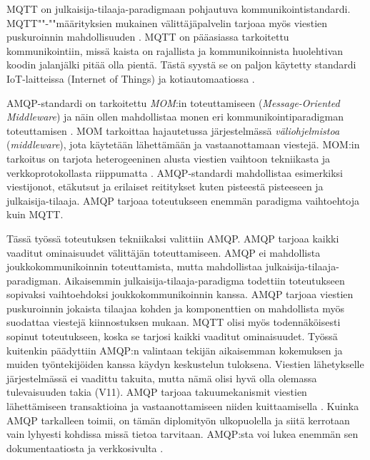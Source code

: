 MQTT on julkaisija-tilaaja-paradigmaan pohjautuva kommunikointistandardi. MQTT""-""mää\-ri\-tyk\-si\-en mukainen välittäjäpalvelin tarjoaa myös viestien puskuroinnin mahdollisuuden \cite{mqtt-specification}. MQTT on pääasiassa tarkoitettu kommunikointiin, missä kaista on rajallista ja kommunikoinnista huolehtivan koodin jalanjälki pitää olla pientä. Tästä syystä se on paljon käytetty standardi IoT-laitteissa (Internet of Things) ja kotiautomaatiossa \cite[s.~9--11]{mqtt-for-iot}.

AMQP-standardi on tarkoitettu \emph{MOM}:in toteuttamiseen (\emph{Message-Oriented Middleware}) ja näin ollen mahdollistaa monen eri kommunikointiparadigman toteuttamisen \cite[s.~6]{AMQP-specification}. MOM tarkoittaa hajautetussa järjestelmässä \emph{väliohjelmistoa} (\emph{middleware}), jota käytetään lähettämään ja vastaanottamaan viestejä. MOM:in tarkoitus on tarjota heterogeeninen alusta viestien vaihtoon tekniikasta ja verkkoprotokollasta riippumatta \cite{mom}. AMQP-standardi mahdollistaa esimerkiksi viestijonot, etäkutsut ja erilaiset reititykset kuten pisteestä pisteeseen ja julkaisija-tilaaja. AMQP tarjoaa toteutukseen enemmän paradigma vaihtoehtoja kuin MQTT.

Tässä työssä toteutuksen tekniikaksi valittiin AMQP. AMQP tarjoaa kaikki vaaditut ominaisuudet välittäjän toteuttamiseen. AMQP ei mahdollista joukkokommunikoinnin toteuttamista, mutta mahdollistaa julkaisija-tilaaja-paradigman. Aikaisemmin julkaisija-ti\-laa\-ja-paradigma todettiin toteutukseen sopivaksi vaihtoehdoksi joukkokommunikoinnin kanssa. AMQP tarjoaa viestien puskuroinnin jokaista tilaajaa kohden ja komponenttien on mahdollista myös suodattaa viestejä kiinnostuksen mukaan. MQTT olisi myös todennäköisesti sopinut toteutukseen, koska se tarjosi kaikki vaaditut ominaisuudet. Työssä kuitenkin päädyttiin AMQP:n valintaan tekijän aikaisemman kokemuksen ja muiden työntekijöiden kanssa käydyn keskustelun tuloksena. Viestien lähetykselle järjestelmässä ei vaadittu takuita, mutta nämä olisi hyvä olla olemassa tulevaisuuden takia (V11). AMQP tarjoaa takuumekanismit viestien lähettämiseen transaktioina ja vastaanottamiseen niiden kuittaamisella \cite[s.~14,21]{AMQP-specification}. Kuinka AMQP tarkalleen toimii, on tämän diplomityön ulkopuolella ja siitä kerrotaan vain lyhyesti kohdissa missä tietoa tarvitaan. AMQP:sta voi lukea enemmän sen dokumentaatiosta \cite{AMQP-specification} ja verkkosivulta \cite{amqp-homepage}.


